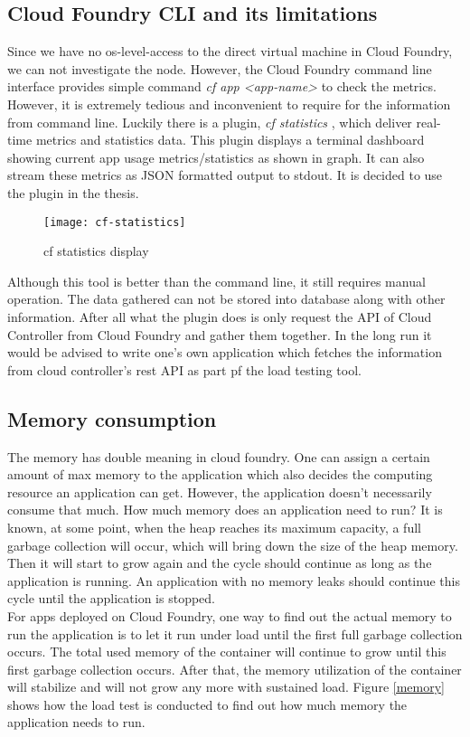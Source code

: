 \subsection{Cloud Foundry CLI and its limitations}
Since we have no os-level-access to the direct virtual machine in Cloud Foundry, we can not investigate the node. However, the Cloud Foundry command line interface provides simple command \textit{cf app <app-name>} to check the metrics. However, it is extremely tedious and inconvenient to require for the information from command line. Luckily there is a plugin, \textit{cf statistics} \citep{cfstatistics}, which deliver real-time metrics and statistics data. This plugin displays a terminal dashboard showing current app usage metrics/statistics as shown in graph. It can also stream these metrics as JSON formatted output to stdout. It is decided to use the plugin in the thesis. \\
\begin{figure}[h]
	\centering
	\texttt{[image: cf-statistics]}
	\caption{cf statistics display}
	\label{cf-statistics}
\end{figure}
Although this tool is better than the command line, it still requires manual operation. The data gathered can not be stored into database along with other information. After all what the plugin does is only request the API of Cloud Controller  \citep{cloudcontroller} from Cloud Foundry and gather them together. In the long run it would be advised to write one's own application which fetches the information from cloud controller's rest API as part pf the load testing tool. 
\subsection{Memory consumption}
The memory has double meaning in cloud foundry. One can assign a certain amount of max memory to the application which also decides the computing resource an application can get. However, the application doesn't necessarily consume that much. How much memory does an application need to run? It is known, at some point, when the heap reaches its maximum capacity, a full garbage collection will occur, which will bring down the size of the heap memory. Then it will start to grow again and the cycle should continue as long as the application is running. An application with no memory leaks should continue this cycle until the application is stopped. \\
For apps deployed on Cloud Foundry, one way to find out the actual memory to run the application is to let it run under load until the first full garbage collection occurs. The total used memory of the container will continue to grow until this first garbage collection occurs. After that, the memory utilization of the container will stabilize and will not grow any more with sustained load. Figure \ref{memory} shows how the load test is conducted to find out how much memory the application needs to run. 

